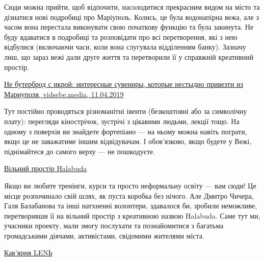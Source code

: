 
Сюди можна прийти, щоб відпочити, насолодитися прекрасним видом на місто та
дізнатися нові подробиці про Маріуполь. Колись, це була водонапірна вежа, але з
часом вона перестала виконувати свою початкову функцію та була закинута. Не
буду вдаватися в подробиці та розповідати про всі перетворення, які з нею
відбулися (включаючи часи, коли вона слугувала відділенням банку). Зазначу лиш,
що зараз вежі дали друге життя та перетворили її у справжній креативний
простір.

\begin{center}
	\begin{fminipage}{0.9\textwidth}
		\href{http://vidsebe.media/read/gajdy/29413/ne-buterbrod-s-ikroj-interesnye-suveniry-kotorye-nestydno-privezti-iz-mariupolya}{%
Не бутерброд с икрой: интересные сувениры, которые нестыдно привезти из Мариуполя, %
vidsebe.media, 11.04.2019}
	\end{fminipage}
\end{center}

Тут постійно проводяться різноманітні івенти (безкоштовні або за символічну
плату): перегляди кінострічок, зустрічі з цікавими людьми, лекції тощо. На
одному з поверхів ви знайдете фортепіано — на ньому можна навіть пограти, якщо
це не заважатиме іншим відвідувачам. І обов'язково, якщо будете у Вежі,
піднімайтеся до самого верху — не пошкодуєте.

\begin{center}
{\Large\href{https://www.facebook.com/halabudavp}{Вільний простір Halabuda}}
\end{center}


Якщо ви любите тренінги, курси та просто неформальну освіту — вам сюди! Це
місце розпочинало свій шлях, як пуста коробка без нічого. Але Дмитро Чичера,
Галя Балабанова та інші натхненні волонтери, здавалося би, зробили неможливе,
перетворивши її на вільний простір з креативною назвою Halabuda. Саме тут ми,
учасники проекту, мали змогу послухати та познайомитися з багатьма громадськими
діячами, активістами, свідомими жителями міста.

\begin{center}
{\Large\href{https://www.facebook.com/laziness.coffee.mrpl}{Кав'ярня LENЬ}}
\end{center}


